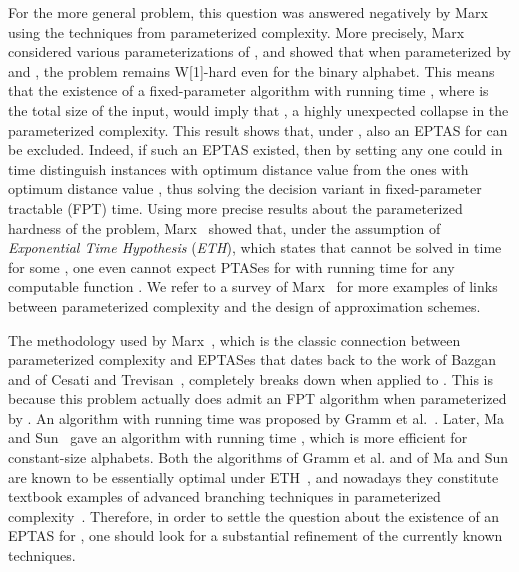 For the more general \clSubstring problem, this question was answered negatively by Marx~\cite{Marx08} using the techniques from parameterized complexity. More precisely, Marx considered various parameterizations of \clSubstring, and showed that when parameterized by  and , the problem remains W[1]-hard even for the binary alphabet. This means that the existence of a fixed-parameter algorithm with running time , where  is the total size of the input, would imply that , a highly unexpected collapse in the parameterized complexity. This result shows that, under , also an EPTAS for \clSubstring can be excluded. Indeed, if such an EPTAS existed, then by setting any  one could in time  distinguish instances with optimum distance value  from the ones with optimum distance value , thus solving the decision variant in fixed-parameter tractable (FPT) time. Using more precise results about the parameterized hardness of the \clique problem, Marx~\cite{Marx08} showed that, under the assumption of {\em{Exponential Time Hypothesis}} ({\em{ETH}}), which states that {} cannot be solved in time  for some , one even cannot expect PTASes for \clSubstring with running time  for any computable function . We refer to a survey of Marx~\cite{Marx08-survey} for more examples of links between parameterized complexity and the design of approximation schemes.

The methodology used by Marx~\cite{Marx08}, which is the classic connection between parameterized complexity and EPTASes that dates back to the work of Bazgan~\cite{bazgan:thesis} and of Cesati and Trevisan~\cite{CesatiT97}, completely breaks down when applied to \clString. This is because this problem actually does admit an FPT algorithm when parameterized by . An algorithm with running time  was proposed by Gramm et al.~\cite{GrammNR03}. Later, Ma and Sun~\cite{MaS09} gave an algorithm with running time , which is more efficient for constant-size alphabets. Both the algorithms of Gramm et al. and of Ma and Sun are known to be essentially optimal under ETH~\cite{LokshtanovMS11}, and nowadays they constitute textbook examples of advanced branching techniques in parameterized complexity~\cite{platypus}. Therefore, in order to settle the question about the existence of an EPTAS for \clString, one should look for a substantial refinement of the currently known techniques.

